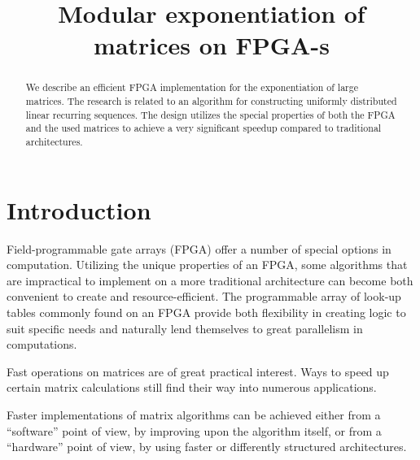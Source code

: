 \documentclass[11pt,twoside]{article}
\begin{document}
\title{
Modular exponentiation of matrices on FPGA-s
}
\maketitle






\begin{abstract}
We describe an efficient FPGA implementation for the exponentiation of large matrices. The research is related to an algorithm for constructing uniformly distributed linear recurring sequences. The design utilizes the special properties of both the FPGA and the used matrices to achieve a very significant speedup compared to traditional architectures.
\end{abstract}


\section{Introduction}

Field-programmable gate arrays (FPGA) offer a number of special options in computation. Utilizing the unique properties of an FPGA, some algorithms that are impractical to implement on a more traditional architecture can become both convenient to create and resource-efficient. The programmable array of look-up tables commonly found on an FPGA provide both flexibility in creating logic to suit specific needs and naturally lend themselves to great parallelism in computations.

Fast operations on matrices are of great practical interest. Ways to speed up certain matrix calculations still find their way into numerous applications.

Faster implementations of matrix algorithms can be achieved either from a ``software'' point of view, by improving upon the algorithm itself, or from a ``hardware'' point of view, by using faster or differently structured architectures.
\end{document}
